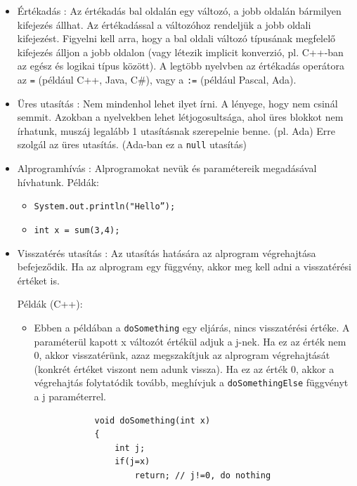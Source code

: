 \documentclass[margin=0px]{article}
\begin{document}
\begin{itemize}
    \item	Értékadás : Az értékadás bal oldalán egy változó, a jobb oldalán bármilyen kifejezés állhat. Az
          értékadással a változóhoz rendeljük a jobb oldali kifejezést. Figyelni kell arra, hogy a bal oldali
          változó típusának megfelelő kifejezés álljon a jobb oldalon (vagy létezik implicit konverzió, pl. C++-ban
          az egész és logikai típus között). A legtöbb nyelvben az értékadás operátora az \texttt{=} (például C++, Java, C\#),
          vagy a \texttt{:=} (például Pascal, Ada).

    \item	Üres utasítás : Nem mindenhol lehet ilyet írni. A lényege, hogy nem csinál semmit.
          Azokban a nyelvekben lehet létjogosultsága,	ahol üres blokkot nem írhatunk,
          muszáj legalább 1 utasításnak szerepelnie benne. (pl. Ada) Erre szolgál az üres utasítás.
          (Ada-ban ez a \texttt{null} utasítás)

    \item	Alprogramhívás : Alprogramokat nevük és paramétereik megadásával hívhatunk.
          Példák:
          \begin{itemize}
              \item	\texttt{System.out.println("Hello”);}
              \item	\texttt{int x = sum(3,4);}
          \end{itemize}
    \item	Visszatérés utasítás : Az utasítás hatására az alprogram végrehajtása befejeződik. Ha az alprogram egy
          függvény, akkor meg kell adni a visszatérési értéket is.

          \noindent Példák (C++):
          \begin{itemize}
              \item	Ebben a példában a \texttt{doSomething} egy eljárás, nincs visszatérési értéke. A paraméterül kapott
                    x változót értékül adjuk a j-nek. Ha ez az érték nem 0, akkor visszatérünk, azaz megszakítjuk az alprogram
                    végrehajtását (konkrét értéket viszont nem adunk vissza). Ha ez az érték 0, akkor a végrehajtás folytatódik tovább,
                    meghívjuk a \texttt{doSomethingElse} függvényt a j paraméterrel.
                    \begin{verbatim}
            void doSomething(int x)
            {
                int j;
                if(j=x) 
                    return; // j!=0, do nothing
            

\end{verbatim}
\end{itemize}
\end{itemize}
\end{document}
